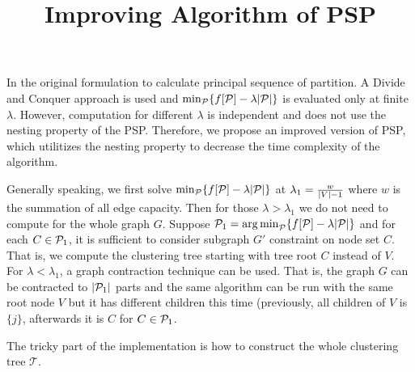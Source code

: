 \documentclass{article}
\title{Improving Algorithm of PSP}
\begin{document}
\maketitle

In the original formulation to calculate principal sequence of partition. A Divide and Conquer approach is used and $\min_{\P} \{f[\P]-\lambda \abs{\P}\}$ is evaluated only at finite $\lambda$. However, computation for different $\lambda$ is independent and does not use the nesting property of the PSP. Therefore, we propose an improved version of PSP, which utilitizes the nesting property to decrease the time complexity of the algorithm.

Generally speaking, we first solve $\min_{\P} \{ f[\P]-\lambda \abs{\P} \}$ at $\lambda_1 = \frac{w}{\abs{V}-1}$ where $w$ is the summation of all edge capacity. Then for those $\lambda > \lambda_1$ we do not need to compute for the whole graph $G$. Suppose $\P_1 = \argmin_{\P} \{ f[\P]-\lambda \abs{\P} \}$ and for each $ C \in \P_1$, it is sufficient to consider subgraph $G'$ constraint on node set $C$. That is, we compute the clustering tree starting with tree root $C$ instead of $V$. For $\lambda < \lambda_1$, a graph contraction technique can be used. That is, the graph $G$ can be contracted to $\abs{\P_1}$ parts and the same algorithm can be run with the same root node $V$ but it has different children this time (previously, all children of $V$ is $\{j\}$, afterwards it is $C$ for $C \in \P_1$.

The tricky part of the implementation is how to construct the whole clustering tree $\mathcal{T}$.
\end{document}
